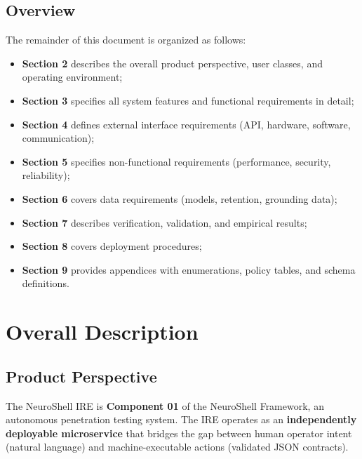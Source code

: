 \documentclass[10pt,journal,onecolumn]{IEEEtran}
\begin{document}
\subsection{Overview}
The remainder of this document is organized as follows:
\begin{itemize}
\item \textbf{Section 2} describes the overall product perspective, user classes, and operating environment;
\item \textbf{Section 3} specifies all system features and functional requirements in detail;
\item \textbf{Section 4} defines external interface requirements (API, hardware, software, communication);
\item \textbf{Section 5} specifies non-functional requirements (performance, security, reliability);
\item \textbf{Section 6} covers data requirements (models, retention, grounding data);
\item \textbf{Section 7} describes verification, validation, and empirical results;
\item \textbf{Section 8} covers deployment procedures;
\item \textbf{Section 9} provides appendices with enumerations, policy tables, and schema definitions.
\end{itemize}
\section{Overall Description}

\subsection{Product Perspective}
The NeuroShell IRE is \textbf{Component 01} of the NeuroShell Framework, an autonomous penetration testing system. The IRE operates as an \textbf{independently deployable microservice} that bridges the gap between human operator intent (natural language) and machine-executable actions (validated JSON contracts).
\end{document}
